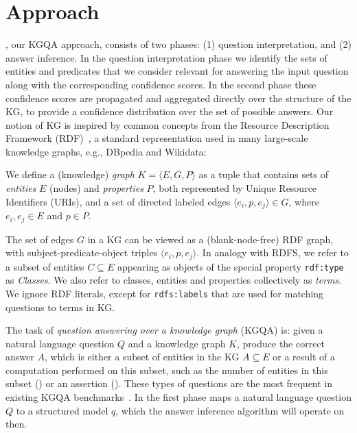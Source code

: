 \section{Approach}
\label{sec:approach}
\OurApproach{}, our KGQA approach, consists of two phases: (1) question interpretation, and (2) answer inference.
In the question interpretation phase we identify the sets of entities and predicates that we consider relevant for answering the input question along with the corresponding confidence scores.
In the second phase these confidence scores are propagated and aggregated directly over the structure of the KG, to provide a confidence distribution over the set of possible answers.
Our notion of KG is inspired by common concepts from the Resource Description Framework (RDF)~\cite{rdf-primer}, a standard representation used in many large-scale knowledge graphs, e.g., DBpedia and Wikidata:

\begin{definition}
\label{def:kg}
\rm
We define a (knowledge) \emph{graph} $K=\langle E,G,P\rangle$ as a tuple that contains sets of \emph{entities} $E$ (nodes) and \emph{properties} $P$, both represented by Unique Resource Identifiers (URIs), and a set of directed labeled edges $\langle e_i, p, e_j\rangle\in G$, where $e_i, e_j \in E$ and $p \in P$.
\end{definition}

\noindent%
The set of edges $G$ in a KG can be viewed as a (blank-node-free) RDF graph, with subject-predicate-object triples $\langle e_i, p, e_j\rangle$.
In analogy with RDFS, we refer to a subset of entities $C \subseteq E$ appearing as objects of the special property \texttt{\small rdf:type} as \emph{Classes}.
We also refer to classes, entities and properties collectively as \textit{terms}.
We ignore RDF literals, except for \texttt{\small rdfs:labels} that are used for matching questions to terms in KG.

The task of \emph{question answering over a knowledge graph} (KGQA) is: given a natural language question $Q$ and a knowledge graph $K$, produce the correct answer $A$, which is either a subset of entities in the KG $A \subseteq E$ or a result of a computation performed on this subset, such as the number of entities in this subset () or an assertion ().
These types of questions are the most frequent in existing KGQA benchmarks~\cite{DBLP:journals/corr/BordesUCW15,DBLP:conf/semweb/TrivediMDL17,DBLP:conf/semweb/UsbeckGN018}.
In the first phase \OurApproach{} maps a natural language question $Q$ to a structured model $q$, which the answer inference algorithm will operate on then. 

